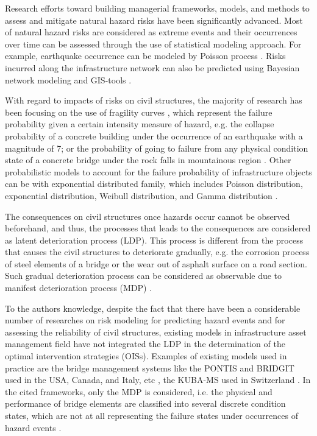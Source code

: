 \documentclass[fleqn]{article}
\begin{document}
Research efforts toward building managerial frameworks, models, and methods to assess and mitigate natural hazard risks have been significantly advanced. Most of natural hazard risks are considered as extreme events and their occurrences over time can be assessed through the use of statistical modeling approach. For example, earthquake occurrence can be modeled by Poisson process \citep{Korup2009}. Risks incurred along the infrastructure network can also be predicted using Bayesian network modeling and GIS-tools \citep{Graf2009, Barufﬁni2010, Noetzli2003}.

With regard to impacts of risks on civil structures, the majority of research has been focusing on the use of fragility curves \citep{Karim2001, Choi2004, Mayet2002}, which represent the failure probability given a certain intensity measure of hazard, e.g. the collapse probability of a concrete building under the occurrence of an earthquake with a magnitude of 7; or the probability of going to failure from any physical condition state of a concrete bridge under the rock falls in mountainous region \citep{Lethanh2013}. Other probabilistic models to account for the failure probability of infrastructure objects can be with exponential distributed family, which includes Poisson distribution, exponential distribution, Weibull distribution, and Gamma distribution \citep{Madanat1995, Lethanh2012b, Cox1959, Davis1952, gertsbakh97}.

The consequences on civil structures once hazards occur cannot be observed beforehand, and thus, the processes that leads to the consequences are considered as latent deterioration process (LDP). This process is different from the process that causes the civil structures to deteriorate gradually, e.g. the corrosion process of steel elements of a bridge or the wear out of asphalt surface on a road section. Such gradual deterioration process can be considered as observable due to manifest deterioration process (MDP) \citep{Lethanh2013}.

To the authors knowledge, despite the fact that there have been a considerable number of researches on risk modeling for predicting hazard events and for assessing the reliability of civil structures, existing models in infrastructure asset management field have not integrated the LDP in the determination of the optimal intervention strategies (OISs). Examples of existing models used in practice are the bridge management systems like the PONTIS and BRIDGIT used in the USA, Canada, and Italy, etc \citep{pontis, Thompson1998, Fruguglietti2012}, the KUBA-MS used in Switzerland \citep{Hajdin2003, ASTRA2010}. In the cited frameworks, only the MDP is considered, i.e. the physical and performance of bridge elements are classified into several discrete condition states, which are not at all representing the failure states under occurrences of hazard events \citep{Mayet2002, Lethanh2013}.
\end{document}
